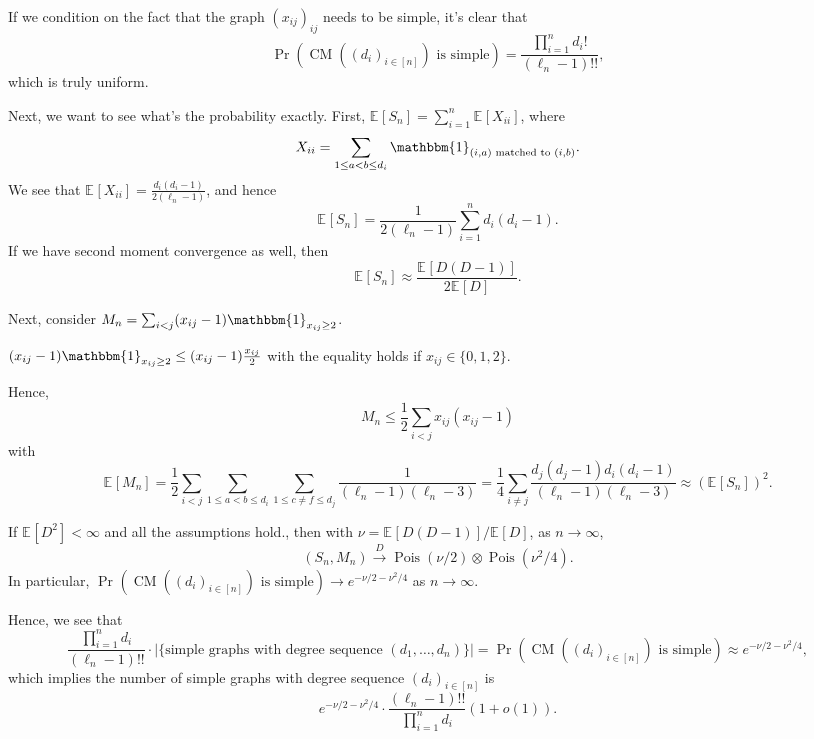 \begin{intuition}
	If we condition on the fact that the graph \((x_{ij})_{ij}\) needs to be simple, it's clear that
	\[
		\Pr_{}\left(\operatorname{CM}((d_i)_{i \in [n]}) \text{ is simple} \right)
		= \frac{\prod_{i=1}^{n} d_i !}{(\ell _n - 1)!!},
	\]
	which is truly uniform.
\end{intuition}

Next, we want to see what's the probability exactly. First, \(\mathbb{E}_{}[S_n] = \sum_{i=1}^{n} \mathbb{E}_{}[X_{ii}] \), where
\[
	X_{ii}
	= \sum_{1 \leq a < b \leq d_i} \mathbbm{1}_{(i, a) \text{ matched to } (i, b)} .
\]
We see that \(\mathbb{E}_{}[X_{ii}] = \frac{d_i (d_i - 1)}{2 (\ell _n - 1)}\), and hence
\[
	\mathbb{E}_{}[S_n]
	= \frac{1}{2 (\ell _n - 1)} \sum_{i=1}^{n} d_i (d_i - 1).
\]
If we have second moment convergence as well, then
\[
	\mathbb{E}_{}[S_n]
	\approx \frac{\mathbb{E}_{}[D (D-1)] }{2 \mathbb{E}_{}[D] }.
\]

Next, consider \(M_n = \sum_{i < j} (x_{ij} - 1) \mathbbm{1}_{x_{ij} \geq 2} \).
\begin{note}
	\((x_{ij} - 1) \mathbbm{1}_{x_{ij} \geq 2} \leq (x_{ij} - 1) \frac{x_{ij}}{2}\) with the equality holds if \(x_{ij} \in \{ 0, 1, 2 \} \).
\end{note}
Hence,
\[
	M_n
	\leq \frac{1}{2} \sum_{i < j} x_{ij} (x_{ij} - 1)
\]
with
\[
	\mathbb{E}_{}[M_n]
	= \frac{1}{2} \sum_{i < j} \sum_{1 \leq a < b \leq d_i} \sum_{1 \leq c \neq f \leq d_j} \frac{1}{(\ell _n - 1) (\ell _n - 3)}
	= \frac{1}{4} \sum_{i \neq j} \frac{d_j (d_j - 1) d_i (d_i - 1)}{(\ell _n - 1) (\ell _n - 3)}
	\approx (\mathbb{E}_{}[S_n] )^2.
\]

\begin{lemma}
	If \(\mathbb{E}_{}[D^2] < \infty \) and all the assumptions hold., then with \(\nu = \mathbb{E}_{}[D (D-1)] / \mathbb{E}_{}[D] \), as \(n \to \infty \),
	\[
		(S_n, M_n)
		\overset{D}{\to} \operatorname{Pois}(\nu / 2) \otimes \operatorname{Pois}(\nu ^2 / 4).
	\]
	In particular, \(\Pr_{}\left(\operatorname{CM}((d_i)_{i \in [n]}) \text{ is simple} \right) \to e^{-\nu / 2 - \nu ^2 / 4}\) as \(n \to \infty \).
\end{lemma}

Hence, we see that
\[
	\frac{\prod_{i=1}^{n} d_i}{(\ell _n - 1)!!} \cdot \lvert \{ \text{simple graphs with degree sequence } (d_1, \dots , d_n) \} \rvert
	= \Pr_{}\left(\operatorname{CM}((d_i)_{i \in [n]}) \text{ is simple} \right)
	\approx e^{-\nu / 2 - \nu ^2 / 4},
\]
which implies the number of simple graphs with degree sequence \((d_i)_{i \in [n]}\) is
\[
	e^{-\nu / 2 - \nu ^2 / 4} \cdot \frac{(\ell _n - 1)!!}{\prod_{i=1}^{n} d_i}(1 + o(1)).
\]

